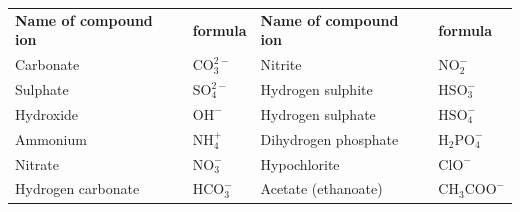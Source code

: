          \begin{table}[H]
        \begin{center}
      \label{m38689*uid99}
    \noindent
      \tablelasttail{}
      \begin{xtabular}[t]{|l|l|l|l|}\hline
                  \textbf{Name of compound ion}
                 &
                  \textbf{formula}
                 &
        \textbf{Name of compound ion} &
        \textbf{formula}%
     \tabularnewline{}
        Carbonate &
        $\mathrm{CO}_{3}^{2-}$ &
        Nitrite &
        $\mathrm{NO}_{2}^{-}$%
     \tabularnewline{}
        Sulphate &
        $\mathrm{SO}_{4}^{2-}$ &
        Hydrogen sulphite &
        $\mathrm{HSO}_{3}^{-}$%
     \tabularnewline{}
        Hydroxide &
        ${\mathrm{OH}}^{-}$ &
        Hydrogen sulphate &
        $\mathrm{HSO}_{4}^{-}$%
     \tabularnewline{}
        Ammonium &
        $\mathrm{NH}_{4}^{+}$ &
        Dihydrogen phosphate &
        ${\mathrm{H}}_{2}\mathrm{PO}_{4}^{-}$%
     \tabularnewline{}
        Nitrate &
        $\mathrm{NO}_{3}^{-}$ &
        Hypochlorite &
        ${\mathrm{ClO}}^{-}$%
     \tabularnewline{}
        Hydrogen carbonate &
        $\mathrm{HCO}_{3}^{-}$ &
        Acetate (ethanoate) &
        ${\mathrm{CH}}_{3}{\mathrm{COO}}^{-}$%
     \tabularnewline{}

\end{xtabular}
\end{center}
\end{table}
